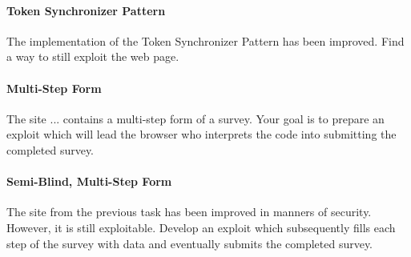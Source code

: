 \documentclass{./handout}
\begin{document}
\begin{subtask}
\paragraph{Token Synchronizer Pattern}
The implementation of the Token Synchronizer Pattern has been improved.
Find a way to still exploit the web page.

\begin{comment}
``Usually, the tokens should be some function (with a secret key - known only
to the server; e.g., MAC) of the cookie! not the cookie.

Than the flow is as follows: 1. Client sends the server request with a
cookie. 2. Server returns a web page with CSRF token(s) for different
purposes (e.g., forms or just a simple get requests via the URL). 3. The
client performs some action (via POST or GET) and sends request with the
token (in the request body or in the URL) and with the cookie. 4. The
server is stateless, but it can verify that the request was sent by the
same client by calculating the function (with the secret key that the
server knows) on the cookie (or on part of it), and comparing the output
with the token.

In the case of CSRF, the cookie is automatically appended to the request by
the browser, but the attacker (that probably even doesn't know the cookie)
cannot add the corresponding tokens.''
\end{comment}

\end{subtask}


\begin{subtask}
\paragraph{Multi-Step Form}
The site ... contains a multi-step form of a survey. Your goal is to
prepare an exploit which will lead the browser who interprets the code
into submitting the completed survey.
\end{subtask}

\begin{subtask}
\paragraph{Semi-Blind, Multi-Step Form}
The site from the previous task has been improved in manners of security. 
However, it is still exploitable.
Develop an exploit which subsequently fills each step of the survey with 
data and eventually submits the completed survey.
\end{subtask}
\end{document}
